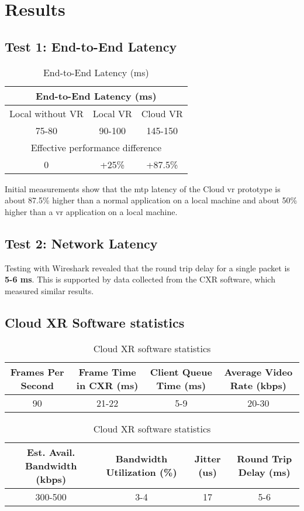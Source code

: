 \section{Results}

\subsection{Test 1: End-to-End Latency}
\begin{table}[h]
\begin{center}
\caption{End-to-End Latency (ms)}
\begin{tabular}{ |c|c|c| }
\hline
\multicolumn{3}{|c|}{End-to-End Latency (ms)}\\
\hline
Local without VR & Local VR & Cloud VR\\
\hline
75-80 & 90-100 & 145-150\\
\hline
\multicolumn{3}{|c|}{Effective performance difference}\\
\hline
0 & +25\% & +87.5\%\\
\hline
\end{tabular}
\end{center}
\end{table}

Initial measurements show that the \acrshort{mtp} latency of the Cloud \acrshort{vr} prototype is about 87.5\% higher than a normal application on a local machine and about 50\% higher than a \acrshort{vr} application on a local machine.

\subsection{Test 2: Network Latency}
Testing with Wireshark \parencite{wireshark} revealed that the round trip delay for a single packet is \textbf{5-6 ms}. This is supported by data collected from the CXR \parencite{cloudxr} software, which measured similar results. 

\subsection{Cloud XR Software statistics}
\begin{table}[h]
\begin{center}
\caption{Cloud XR software statistics}
\begin{tabular}{|c|c|c|c|}
\hline
Frames Per Second & Frame Time in CXR (\acrshort{ms}) & Client Queue Time (\acrshort{ms}) & Average Video Rate (kbps)  \\ \hline
90 & 21-22 & 5-9 & 20-30 \\ \hline
\end{tabular}
\begin{tabular}{|c|c|c|c|}
\hline
Est. Avail. Bandwidth (kbps) & Bandwidth Utilization (\%) & Jitter (\acrshort{us}) & Round Trip Delay (\acrshort{ms}) \\ \hline
300-500 & 3-4 & 17 & 5-6 \\ \hline
\end{tabular}
\end{center}
\end{table}

